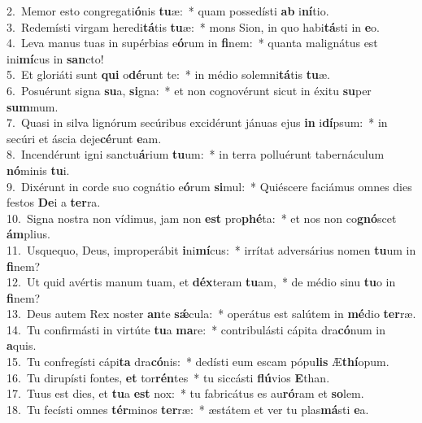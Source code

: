 {2.~}Memor esto congregati\textbf{ó}nis \textbf{tu}æ:~* quam possedísti \textbf{ab} i\textbf{ní}tio.\\
{3.~}Redemísti virgam heredi\textbf{tá}tis \textbf{tu}æ:~* mons Sion, in quo habi\textbf{tá}sti in \textbf{e}o.\\
{4.~}Leva manus tuas in supérbias e\textbf{ó}rum in \textbf{fi}nem:~* quanta malignátus est ini\textbf{mí}cus in \textbf{san}cto!\\
{5.~}Et gloriáti sunt \textbf{qui} o\textbf{dé}runt te:~* in médio solemni\textbf{tá}tis \textbf{tu}æ.\\
{6.~}Posuérunt signa \textbf{su}a, \textbf{si}gna:~* et non cognovérunt sicut in éxitu \textbf{su}per \textbf{sum}mum.\\
{7.~}Quasi in silva lignórum secúribus excidérunt jánuas ejus \textbf{in} i\textbf{dí}psum:~* in secúri et áscia deje\textbf{cé}runt \textbf{e}am.\\
{8.~}Incendérunt igni sanctu\textbf{á}rium \textbf{tu}um:~* in terra polluérunt tabernáculum \textbf{nó}minis \textbf{tu}i.\\
{9.~}Dixérunt in corde suo cognátio e\textbf{ó}rum \textbf{si}mul:~* Quiéscere faciámus omnes dies festos \textbf{De}i a \textbf{ter}ra.\\
{10.~}Signa nostra non vídimus, jam non \textbf{est} pro\textbf{phé}ta:~* et nos non co\textbf{gnó}scet \textbf{ám}plius.\\
{11.~}Usquequo, Deus, improperábit \textbf{i}ni\textbf{mí}cus:~* irrítat adversárius nomen \textbf{tu}um in \textbf{fi}nem?\\
{12.~}Ut quid avértis manum tuam, et \textbf{déx}teram \textbf{tu}am,~* de médio sinu \textbf{tu}o in \textbf{fi}nem?\\
{13.~}Deus autem Rex noster \textbf{an}te \textbf{sǽ}cula:~* operátus est salútem in \textbf{mé}dio \textbf{ter}ræ.\\
{14.~}Tu confirmásti in virtúte \textbf{tu}a \textbf{ma}re:~* contribulásti cápita dra\textbf{có}num in \textbf{a}quis.\\
{15.~}Tu confregísti cápi\textbf{ta} dra\textbf{có}nis:~* dedísti eum escam pópu\textbf{lis} Æ\textbf{thí}opum.\\
{16.~}Tu dirupísti fontes, \textbf{et} tor\textbf{rén}tes~* tu siccásti \textbf{flú}vios \textbf{E}than.\\
{17.~}Tuus est dies, et \textbf{tu}a \textbf{est} nox:~* tu fabricátus es au\textbf{ró}ram et \textbf{so}lem.\\
{18.~}Tu fecísti omnes \textbf{tér}minos \textbf{ter}ræ:~* æstátem et ver tu plas\textbf{má}sti \textbf{e}a.\\
